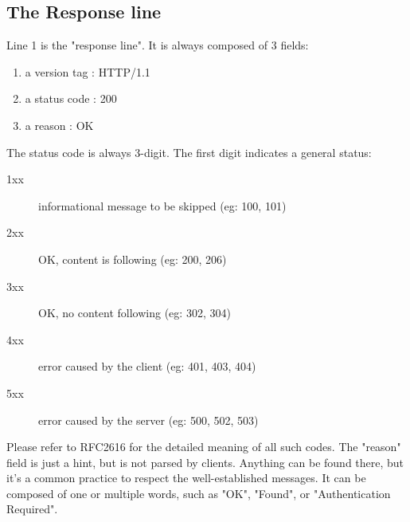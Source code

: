 \subsection{The Response line}
Line 1 is the "response line". It is always composed of 3 fields:
\begin{enumerate}
\item a version tag : HTTP/1.1
\item a status code : 200
\item a reason      : OK
\end{enumerate}

The status code is always 3-digit. The first digit indicates a general status:
\begin{description}
\item[1xx] informational message to be skipped (eg: 100, 101)
\item[2xx] OK, content is following   (eg: 200, 206)
\item[3xx] OK, no content following   (eg: 302, 304)
\item[4xx] error caused by the client (eg: 401, 403, 404)
\item[5xx] error caused by the server (eg: 500, 502, 503)
\end{description}

Please refer to RFC2616 for the detailed meaning of all such codes. The
"reason" field is just a hint, but is not parsed by clients. Anything can be
found there, but it's a common practice to respect the well-established
messages. It can be composed of one or multiple words, such as "OK", "Found",
or "Authentication Required".

